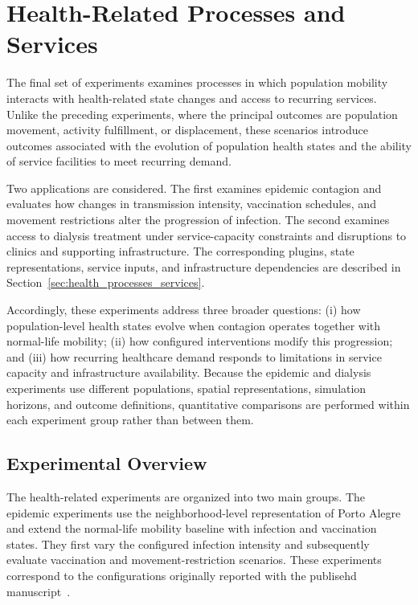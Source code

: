 \section{Health-Related Processes and Services}
\label{sec:results_health_processes_services}

The final set of experiments examines processes in which population mobility interacts with health-related state changes and access to recurring services. Unlike the preceding experiments, where the principal outcomes are population movement, activity fulfillment, or displacement, these scenarios introduce outcomes associated with the evolution of population health states and the ability of service facilities to meet recurring demand.

Two applications are considered. The first examines epidemic contagion and evaluates how changes in transmission intensity, vaccination schedules, and movement restrictions alter the progression of infection. The second examines access to dialysis treatment under service-capacity constraints and disruptions to clinics and supporting infrastructure. The corresponding plugins, state representations, service inputs, and infrastructure dependencies are described in Section~\ref{sec:health_processes_services}.%

Accordingly, these experiments address three broader questions: (i) how population-level health states evolve when contagion operates together with normal-life mobility; (ii) how configured interventions modify this progression; and (iii) how recurring healthcare demand responds to limitations in service capacity and infrastructure availability. Because the epidemic and dialysis experiments use different populations, spatial representations, simulation horizons, and outcome definitions, quantitative comparisons are performed within each experiment group rather than between them.


\subsection{Experimental Overview}
\label{sec:health_results_overview}

The health-related experiments are organized into two main groups. The epidemic experiments use the neighborhood-level representation of Porto Alegre and extend the normal-life mobility baseline with infection and vaccination states. They first vary the configured infection intensity and subsequently evaluate vaccination and movement-restriction scenarios. These experiments correspond to the configurations originally reported with the publisehd manuscript~\cite{silva2026lodusPop}.

